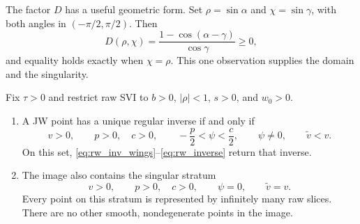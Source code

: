 \documentclass[11pt]{article}
\newcommand{\vmin}{\widetilde v}
\begin{document}
The factor $D$ has a useful geometric form.  Set
$\rho=\sin\alpha$ and $\chi=\sin\gamma$, with both angles in
$(-\pi/2,\pi/2)$.  Then
\begin{equation}
D(\rho,\chi)
=\frac{1-\cos(\alpha-\gamma)}{\cos\gamma}\ge0,
\label{eq:rw_D_angle}
\end{equation}
and equality holds exactly when $\chi=\rho$.  This one observation supplies
the domain and the singularity.

\begin{theorem}
\label{thm:rw_image}
Fix $\tau>0$ and restrict raw SVI to
$b>0$, $|\rho|<1$, $s>0$, and $w_0>0$.

\begin{enumerate}[leftmargin=1.6em]
\item A JW point has a unique regular inverse if and only if
\begin{equation}
v>0,\qquad p>0,\quad c>0,\qquad
-\frac p2<\psi<\frac c2,\qquad
\psi\ne0,\qquad \vmin<v.
\label{eq:rw_regular_domain}
\end{equation}
On this set, \eqref{eq:rw_inv_wings}--\eqref{eq:rw_inverse} return that inverse.
\item The image also contains the singular stratum
\begin{equation}
v>0,\qquad p>0,\quad c>0,\qquad
\psi=0,\qquad \vmin=v.
\label{eq:rw_singular_domain}
\end{equation}
Every point on this stratum is represented by infinitely many raw slices.
There are no other smooth, nondegenerate points in the image.
\end{enumerate}
\end{theorem}
\end{document}

